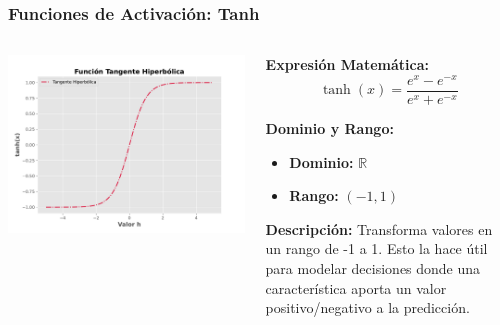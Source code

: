 \begin{frame}
	\frametitle{Funciones de Activación: Tanh}
	\begin{columns}
		
		\begin{column}{0.5\textwidth} %
			\includegraphics[width=\textwidth]{img/tanh.pdf} %
		\end{column}
		
		\begin{column}{0.5\textwidth} %
			\textbf{Expresión Matemática:}
			\[ \tanh(x) = \frac{e^{x} - e^{-x}}{e^{x} + e^{-x}} \]
			
			\textbf{Dominio y Rango:}
			\begin{itemize}
				\item \textbf{Dominio:} $\mathbb{R}$ 
				\item \textbf{Rango:} $(-1, 1)$
			\end{itemize}
			
			\textbf{Descripción:} Transforma valores en un rango de -1 a 1. Esto la hace útil para modelar decisiones donde una característica aporta un valor positivo/negativo a la predicción.

		\end{column}
		
	\end{columns}
	
\end{frame}


